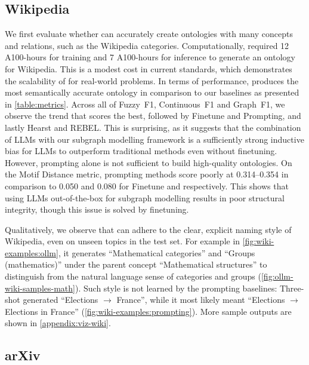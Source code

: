 

\subsection{Wikipedia}

We first evaluate whether \name can accurately create ontologies with many concepts and relations, such as the Wikipedia categories. Computationally, \name required 12 A100-hours for training and 7 A100-hours for inference to generate an ontology for Wikipedia. This is a modest cost in current standards, which demonstrates the scalability of \name for real-world problems.
In terms of performance, \name produces the most semantically accurate ontology in comparison to our baselines as presented in \cref{table:metrics}. Across all of Fuzzy~F1, Continuous~F1 and Graph~F1, we observe the trend that \name scores the best, followed by Finetune and Prompting, and lastly Hearst and REBEL. This is surprising, as it suggests that the combination of LLMs with our subgraph modelling framework is a sufficiently strong inductive bias for LLMs to outperform traditional methods even without finetuning. However, prompting alone is not sufficient to build high-quality ontologies.
On the Motif Distance metric, prompting methods score poorly at 0.314--0.354 in comparison to 0.050 and 0.080 for Finetune and \name respectively. This shows that using LLMs out-of-the-box for subgraph modelling results in poor structural integrity, though this issue is solved by finetuning.



Qualitatively, we observe that \name can adhere to the clear, explicit naming style of Wikipedia, even on unseen topics in the test set. For example in \cref{fig:wiki-examples:ollm}, it generates ``Mathematical categories'' and ``Groups (mathematics)'' under the parent concept ``Mathematical structures'' to distinguish from the natural language sense of categories and groups (\cref{fig:ollm-wiki-samples-math}). Such style is not learned by the prompting baselines: Three-shot generated ``Elections $\to$ France'', while it most likely meant ``Elections $\to$ Elections in France'' (\cref{fig:wiki-examples:prompting}). More sample outputs are shown in \cref{appendix:viz-wiki}.

\subsection{arXiv}

